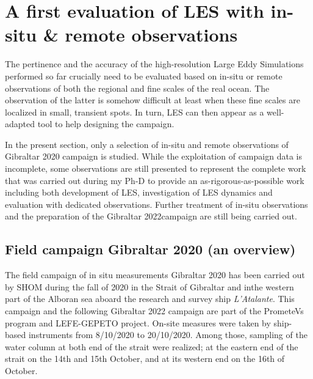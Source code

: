 
\section[A first evaluation of LES with in-situ \& remote observations]{A first evaluation of LES with in-situ \& remote observations}
\label{sectionCampagne}

The pertinence and the accuracy of the high-resolution Large Eddy Simulations performed so far crucially need to be evaluated based on in-situ or remote observations of both the regional and fine scales of the real ocean. The observation of the latter is somehow difficult at least when these fine scales are localized in small, transient spots. In turn, LES can then appear as a well-adapted tool to help designing the campaign.

In the present section, only a selection of in-situ and remote observations of Gibraltar 2020 campaign is studied. While the exploitation of campaign data is incomplete, some observations are still presented to represent the complete work that was carried out during my Ph-D to provide an as-rigorous-as-possible work including both development of LES, investigation of LES dynamics and evaluation with dedicated observations. Further treatment of in-situ observations and the preparation of the Gibraltar 2022campaign are still being carried out.

\subsection{Field campaign Gibraltar 2020 (an overview)}
The field campaign of in situ measurements Gibraltar 2020 has been carried out by SHOM during the fall of 2020 in the Strait of Gibraltar and inthe western part of the Alboran sea aboard the research and survey ship \textit{L'Atalante}. This campaign and the following Gibraltar 2022 campaign are part of the PrometeVs program and LEFE-GEPETO project. On-site measures were taken by ship-based instruments from 8/10/2020 to 20/10/2020. Among those, sampling of the water column at both end of the strait were realized; at the eastern end of the strait on the 14th and 15th October, and at its western end on the 16th of October.

